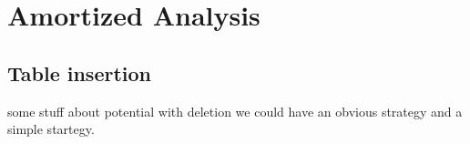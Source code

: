 \chapter{Amortized Analysis}
\section{Table insertion}
some stuff about potential
with deletion we could have an obvious strategy and a simple startegy.
